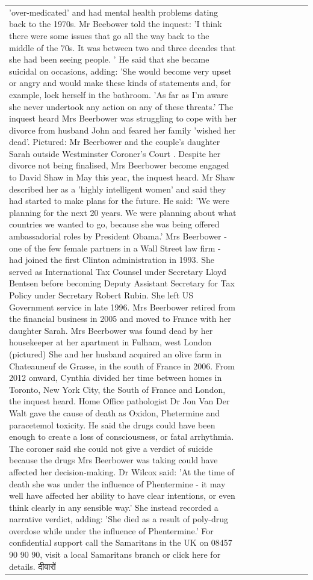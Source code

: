 \begin{table}[H]
\begin{tabular}{lllrlllll}
'over-medicated' and had mental health problems dating back to the 1970s. Mr Beebower told the inquest: 'I think there were some issues that go all the way back to the middle of the 70s. It was between two and three decades that she had been seeing people. ' He said that she became suicidal on occasions, adding: 'She would become very upset or angry and would make these kinds of statements and, for example, lock herself in the bathroom. 'As far as I'm aware she never undertook any action on any of these threats.' The inquest heard Mrs Beerbower was struggling to cope with her divorce from husband John and feared her family 'wished her dead'. Pictured: Mr Beerbower and the couple's daughter Sarah outside Westminster Coroner's Court . Despite her divorce not being finalised, Mrs Beerbower become engaged to David Shaw in May this year, the inquest heard. Mr Shaw described her as a 'highly intelligent women' and said they had started to make plans for the future. He said: 'We were planning for the next 20 years. We were planning about what countries we wanted to go, because she was being offered ambassadorial roles by President Obama.' Mrs Beerbower - one of the few female partners in a Wall Street law firm - had joined the first Clinton administration in 1993. She served as International Tax Counsel under Secretary Lloyd Bentsen before becoming Deputy Assistant Secretary for Tax Policy under Secretary Robert Rubin. She left US Government service in late 1996. Mrs Beerbower retired from the financial business in 2005 and moved to France with her daughter Sarah. Mrs Beerbower was found dead by her housekeeper at her apartment in Fulham, west London (pictured) She and her husband acquired an olive farm in Chateauneuf de Grasse, in the south of France in 2006. From 2012 onward, Cynthia divided her time between homes in Toronto, New York City, the South of France and London, the inquest heard. Home Office pathologist Dr Jon Van Der Walt gave the cause of death as Oxidon, Phetermine and paracetemol toxicity. He said the drugs could have been enough to create a loss of consciousness, or fatal arrhythmia. The coroner said she could not give a verdict of suicide because the drugs Mrs Beerbower was taking could have affected her decision-making. Dr Wilcox said: 'At the time of death she was under the influence of Phentermine - it may well have affected her ability to have clear intentions, or even think clearly in any sensible way.' She instead recorded a narrative verdict, adding: 'She died as a result of poly-drug overdose while under the influence of Phentermine.' For confidential support call the Samaritans in the UK on 08457 90 90 90, visit a local Samaritans branch or click here for details. दीवारों \\

\end{tabular}
\end{table}
